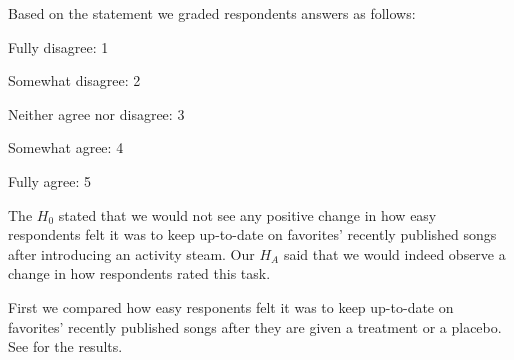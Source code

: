 Based on the statement
we graded respondents answers as follows:

\begin{items}
  \item Fully disagree: 1
  \item Somewhat disagree: 2
  \item Neither agree nor disagree: 3
  \item Somewhat agree: 4
  \item Fully agree: 5
\end{items}

The $H_0$ stated that we would not see any positive change in how easy
respondents felt it was to keep up-to-date on favorites' recently published
songs after introducing an activity steam. Our $H_A$ said that we
would indeed observe a change in how respondents rated this task.

First we compared how easy responents felt it was to keep up-to-date on
favorites' recently published songs after they are given a treatment
or a placebo.
See
 for the results.

